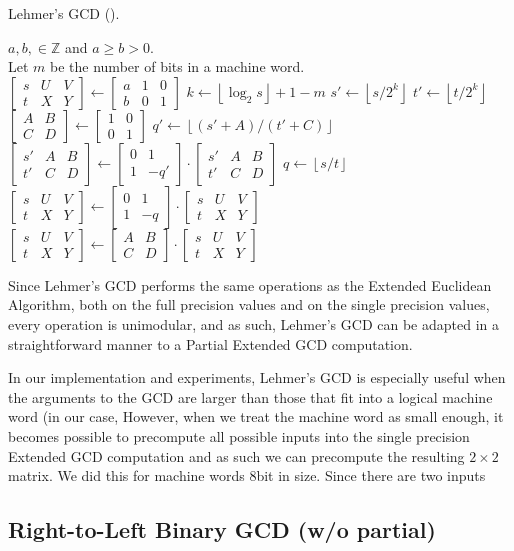 \documentclass{ucalgthes1}
\theoremstyle{plain}
\theoremstyle{definition}
\newcommand{\ZZ}{\mathbb{Z}}
\newcommand{\matrixtt}[4]{\left[ \begin{array}{rr} #1 & #2 \\ #3 & #4 \end{array} \right]}
\newcommand{\matrixThreeTwo}[6]{\left[ \begin{array}{rrr} #1 & #2 & #3 \\ #4 & #5 & #6 \end{array} \right]}
\newcommand{\floor}[1]{\left\lfloor #1 \right\rfloor}
\begin{document}
\begin{algorithm}[h]
\caption{Lehmer's GCD (\cite{Lehmer1938}).}
\label{alg:lehmerGcd}
\begin{algorithmic}[1]
\REQUIRE $a,b, \in \ZZ$ and $a \ge b > 0$. \\
         Let $m$ be the number of bits in a machine word. \\
\STATE $\matrixThreeTwo{s}{U}{V}{t}{X}{Y} \gets \matrixThreeTwo{a}{1}{0}{b}{0}{1}$
	\STATE $k \gets \floor{\log_2 s} + 1 - m$
	\STATE $s' \gets \floor{s / 2^k}$ 
	\STATE $t' \gets \floor{t / 2^k}$
	\STATE $\matrixtt{A}{B}{C}{D} \gets \matrixtt{1}{0}{0}{1}$
	\WHILE{$t' \neq 0$ and $\floor{(s'+A)/(t'+C)} = \floor{(s'+B)/(t'+D)}$}
		\STATE $q' \gets \floor{(s'+A)/(t'+C)}$ 
		\STATE $\matrixThreeTwo{s'}{A}{B}{t'}{C}{D} \gets \matrixtt{0}{1}{1}{-q'}
			    \cdot \matrixThreeTwo{s'}{A}{B}{t'}{C}{D}$
	\ENDWHILE
		\STATE $q \gets \floor{s/t}$  
		\STATE $\matrixThreeTwo{s}{U}{V}{t}{X}{Y} \gets \matrixtt{0}{1}{1}{-q}
		        \cdot \matrixThreeTwo{s}{U}{V}{t}{X}{Y}$
	\ELSE
		\STATE $\matrixThreeTwo{s}{U}{V}{t}{X}{Y} \gets \matrixtt{A}{B}{C}{D}
		        \cdot \matrixThreeTwo{s}{U}{V}{t}{X}{Y}$ 
	\ENDIF
\ENDWHILE
\end{algorithmic}
\end{algorithm}

Since Lehmer's GCD performs the same operations as the Extended Euclidean Algorithm, both on the full precision values and on the single precision values, every operation is unimodular, and as such, Lehmer's GCD can be adapted in a straightforward manner to a Partial Extended GCD computation.

In our implementation and experiments, Lehmer's GCD is especially useful when the arguments to the GCD are larger than those that fit into a logical machine word (in our case,  However, when we treat the machine word as small enough, it becomes possible to precompute all possible inputs into the single precision Extended GCD computation and as such we can precompute the resulting $2 \times 2$ matrix.  We did this for machine words 8bit in size.  Since there are two inputs

\subsection{Right-to-Left Binary GCD (w/o partial)}
\end{document}
